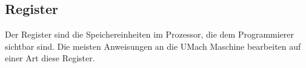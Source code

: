 \subsection{Register}
\label{subsec:Register}

Der \gls{Register} sind die Speichereinheiten im Prozessor, die dem
Programmierer sichtbar sind.
Die meisten Anweisungen an die UMach Maschine bearbeiten auf einer Art diese
Register.

